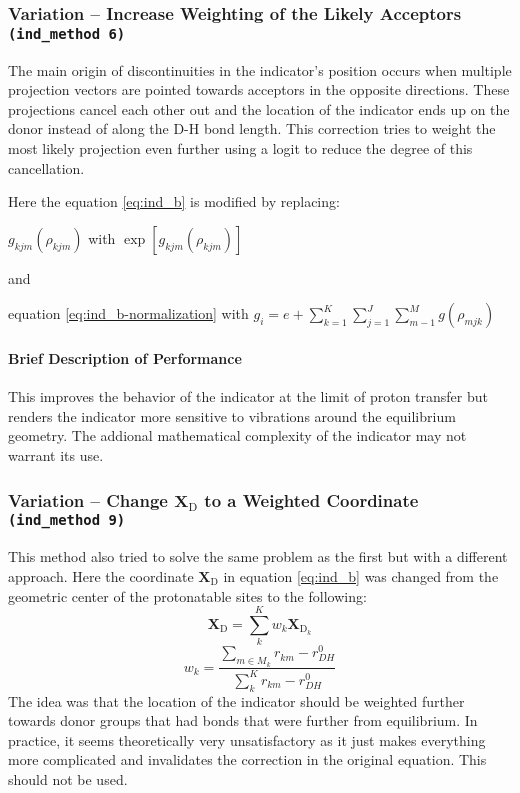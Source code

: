 \documentclass{article}
\newcommand{\mb}[1]{\mathbf{#1}}
\newcommand{\mr}[1]{\mathrm{#1}}
\begin{document}
\subsubsection{Variation -- Increase Weighting of the Likely Acceptors \texttt{(ind\_method 6)}}\label{ss:indicator6}
The main origin of discontinuities in the indicator's position occurs when multiple projection vectors are pointed towards acceptors in the opposite directions.
These projections cancel each other out and the location of the indicator ends up on the donor instead of along the D-H bond length.
This correction tries to weight the most likely projection even further using a logit to reduce the degree of this cancellation.

Here the equation \ref{eq:ind_b} is modified by replacing:

\begin{center}
$g_{kjm}(\rho_{kjm})$ with $\exp \left[ g_{kjm}(\rho_{kjm}) \right]$

and

equation \ref{eq:ind_b-normalization} with $g_i = e + \sum^K_{k=1} \sum^J_{j=1}   \sum^M_{m-1} g(\rho_{mjk})$
\end{center}

\paragraph{Brief Description of Performance}
This improves the behavior of the indicator at the limit of proton transfer but renders the indicator more sensitive to vibrations around the equilibrium geometry.
The addional mathematical complexity of the indicator may not warrant its use.

\subsubsection{Variation -- Change $\mb{X}_{\mr{D}}$ to a Weighted Coordinate \texttt{(ind\_method 9)}}\label{ss:indicator9}
This method also tried to solve the same problem as the first but with a different approach.
Here the coordinate $\mb{X}_{\mr{D}}$ in equation \ref{eq:ind_b} was changed from the geometric center of the protonatable sites to the following:
\begin{equation}
\mb{X}_{\mr{D}} = \sum_k^K w_k \mb{X}_{\mr{D}_k}
\end{equation}
\begin{equation}
w_k = \frac{\sum_{m \in M_k} r_{km} - r^0_{DH} }{\sum_k^K r_{km} - r^0_{DH}}
\end{equation}
The idea was that the location of the indicator should be weighted further towards donor groups that had bonds that were further from equilibrium.
In practice, it seems theoretically very unsatisfactory as it just makes everything more complicated and invalidates the correction in the original equation.
This should not be used.
\end{document}
